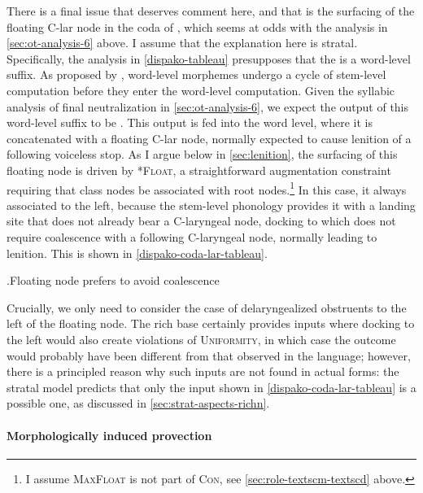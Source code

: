 There is a final issue that deserves comment here, and that is the surfacing of the floating C-lar node in the coda of , which seems at odds with the analysis in \cref{sec:ot-analysis-6} above. I assume that the explanation here is stratal. Specifically, the analysis in \ref{dispako-tableau} presupposes that the  is a word\hyp level suffix. As proposed by \citet{mohanan,baker05,buckler12:_word}, word\hyp level morphemes undergo a cycle of stem\hyp level computation before they enter the word\hyp level computation. Given the syllabic analysis of final neutralization in \cref{sec:ot-analysis-6}, we expect the output of this word\hyp level suffix to be \ipa{[ˈdiz̥]}. This output is fed into the word level, where it is concatenated with a floating C-lar node, normally expected to cause lenition of a following voiceless stop. As I argue below in \cref{sec:lenition}, the surfacing of this floating node is driven by \textsc{*Float}, a straightforward augmentation constraint requiring that class nodes be associated with root nodes.\footnote{I assume \textsc{MaxFloat} \citep{wolf2005,wolf-forautosegs} is not part of \textsc{Con}, see \cref{sec:role-textscm-textscd} above.} In this case, it always associated to the left, because the stem\hyp level phonology provides it with a landing site that does not already bear a C-laryngeal node, docking to which does not require coalescence with a following C-laryngeal node, normally leading to lenition. This is shown in \ref{dispako-coda-lar-tableau}.

\ex.\label{dispako-coda-lar-tableau}Floating node prefers to avoid coalescence\\
\wraptbl[.8\columnwidth]{}

Crucially, we only need to consider the case of delaryngealized obstruents to the left of the floating node. The rich base certainly provides inputs where docking to the left would also create violations of \textsc{Uniformity}, in which case the outcome would probably have been different from that observed in the language; however, there is a principled reason why such inputs are not found in actual forms: the stratal model predicts that only the input shown in \ref{dispako-coda-lar-tableau} is a possible one, as discussed in \cref{sec:strat-aspects-richn}.

\paragraph{Morphologically induced provection}
\label{sec:morph-induc-prov}

